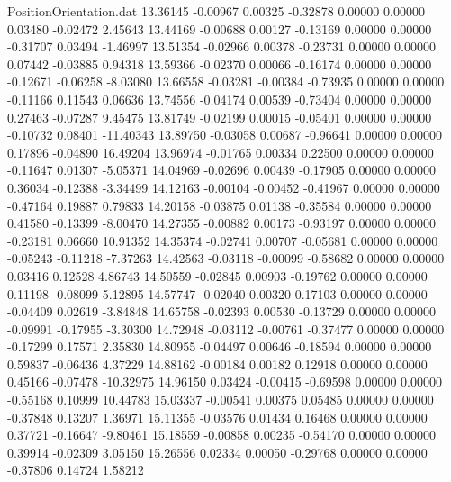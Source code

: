 \begin{filecontents}{PositionOrientation.dat}
  13.36145   -0.00967    0.00325    -0.32878    0.00000    0.00000    0.03480   -0.02472    2.45643
  13.44169   -0.00688    0.00127    -0.13169    0.00000    0.00000   -0.31707    0.03494   -1.46997
  13.51354   -0.02966    0.00378    -0.23731    0.00000    0.00000    0.07442   -0.03885    0.94318
  13.59366   -0.02370    0.00066    -0.16174    0.00000    0.00000   -0.12671   -0.06258   -8.03080
  13.66558   -0.03281   -0.00384    -0.73935    0.00000    0.00000   -0.11166    0.11543    0.06636
  13.74556   -0.04174    0.00539    -0.73404    0.00000    0.00000    0.27463   -0.07287    9.45475
  13.81749   -0.02199    0.00015    -0.05401    0.00000    0.00000   -0.10732    0.08401  -11.40343
  13.89750   -0.03058    0.00687    -0.96641    0.00000    0.00000    0.17896   -0.04890   16.49204
  13.96974   -0.01765    0.00334     0.22500    0.00000    0.00000   -0.11647    0.01307   -5.05371
  14.04969   -0.02696    0.00439    -0.17905    0.00000    0.00000    0.36034   -0.12388   -3.34499
  14.12163   -0.00104   -0.00452    -0.41967    0.00000    0.00000   -0.47164    0.19887    0.79833
  14.20158   -0.03875    0.01138    -0.35584    0.00000    0.00000    0.41580   -0.13399   -8.00470
  14.27355   -0.00882    0.00173    -0.93197    0.00000    0.00000   -0.23181    0.06660   10.91352
  14.35374   -0.02741    0.00707    -0.05681    0.00000    0.00000   -0.05243   -0.11218   -7.37263
  14.42563   -0.03118   -0.00099    -0.58682    0.00000    0.00000    0.03416    0.12528    4.86743
  14.50559   -0.02845    0.00903    -0.19762    0.00000    0.00000    0.11198   -0.08099    5.12895
  14.57747   -0.02040    0.00320     0.17103    0.00000    0.00000   -0.04409    0.02619   -3.84848
  14.65758   -0.02393    0.00530    -0.13729    0.00000    0.00000   -0.09991   -0.17955   -3.30300
  14.72948   -0.03112   -0.00761    -0.37477    0.00000    0.00000   -0.17299    0.17571    2.35830
  14.80955   -0.04497    0.00646    -0.18594    0.00000    0.00000    0.59837   -0.06436    4.37229
  14.88162   -0.00184    0.00182     0.12918    0.00000    0.00000    0.45166   -0.07478  -10.32975
  14.96150    0.03424   -0.00415    -0.69598    0.00000    0.00000   -0.55168    0.10999   10.44783
  15.03337   -0.00541    0.00375     0.05485    0.00000    0.00000   -0.37848    0.13207    1.36971
  15.11355   -0.03576    0.01434     0.16468    0.00000    0.00000    0.37721   -0.16647   -9.80461
  15.18559   -0.00858    0.00235    -0.54170    0.00000    0.00000    0.39914   -0.02309    3.05150
  15.26556    0.02334    0.00050    -0.29768    0.00000    0.00000   -0.37806    0.14724    1.58212

\end{filecontents}
